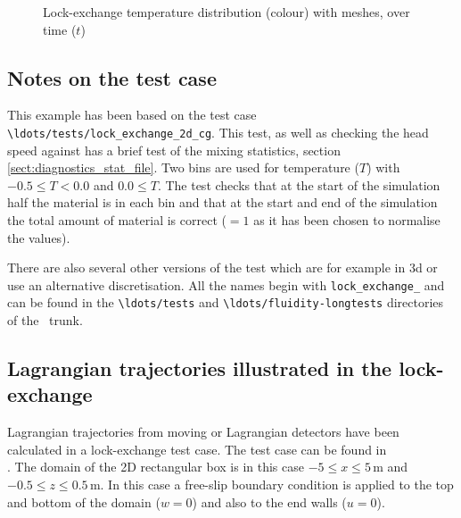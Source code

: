 \begin{figure}[ht]
  \centering
  \caption{Lock-exchange temperature distribution (colour) with meshes, over time ($t$)}
  \label{fig:lock_exchange}
\end{figure}

\subsection{Notes on the test case}
This example has been based on the test case \lstinline[language=bash]+\ldots/tests/lock_exchange_2d_cg+. This test, as well as checking the head speed against \cite{hartel_00} has a brief test of the mixing statistics, section \ref{sect:diagnostics_stat_file}. Two bins are used for temperature ($T$) with $-0.5\leq T<0.0$ and $0.0 \leq T$. The test checks that at the start of the simulation half the material is in each bin and that at the start and end of the simulation the total amount of material is correct ($=1$ as it has been chosen to normalise the values). 

There are also several other versions of the test which are for example in 3d or use an alternative discretisation. All the names begin with \lstinline[language=bash]+lock_exchange_+ and can be found in the \lstinline[language=bash]+\ldots/tests+ and \lstinline[language=bash]+\ldots/fluidity-longtests+ directories of the \fluidity\ trunk.  

\subsection{Lagrangian trajectories illustrated in the lock-exchange}
\label{sect:lock_exchange_Lagrangian_trajectories}
Lagrangian trajectories from moving or Lagrangian detectors have been calculated in a lock-exchange test case. The test case can be found in  \\ . The domain of the 2D rectangular box is in this case $-5\leq x \leq 5\,$m and $-0.5 \leq z \leq 0.5\,$m. In this case a free-slip boundary condition is applied to the top and bottom of the domain ($w = 0$) and also to the end walls ($u = 0$).

